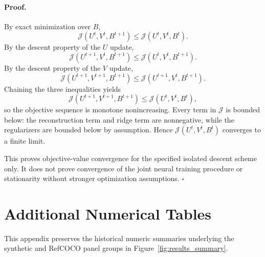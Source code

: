\documentclass[11pt,a4paper]{article}
\begin{document}
\paragraph{Proof.}
By exact minimization over $B$,
\[
\mathcal{J}(U^t,V^t,B^{t+1}) \le \mathcal{J}(U^t,V^t,B^t).
\]
By the descent property of the $U$ update,
\[
\mathcal{J}(U^{t+1},V^t,B^{t+1}) \le \mathcal{J}(U^t,V^t,B^{t+1}).
\]
By the descent property of the $V$ update,
\[
\mathcal{J}(U^{t+1},V^{t+1},B^{t+1}) \le \mathcal{J}(U^{t+1},V^t,B^{t+1}).
\]
Chaining the three inequalities yields
\[
\mathcal{J}(U^{t+1},V^{t+1},B^{t+1}) \le \mathcal{J}(U^t,V^t,B^t),
\]
so the objective sequence is monotone nonincreasing. Every term in $\mathcal{J}$ is bounded below: the reconstruction term and ridge term are nonnegative, while the regularizers are bounded below by assumption. Hence $\mathcal{J}(U^t,V^t,B^t)$ converges to a finite limit.

This proves objective-value convergence for the specified isolated descent scheme only. It does not prove convergence of the joint neural training procedure or stationarity without stronger optimization assumptions. \hfill $\square$

\section{Additional Numerical Tables}
\label{app:numerics}

This appendix preserves the historical numeric summaries underlying the synthetic and RefCOCO panel groups in Figure~\ref{fig:results_summary}.

\begin{table}[htbp]
\caption{Massive synthetic comparison with an unconstrained low-rank factorization. Means and standard deviations are over 20 seeds; paired two-sided $t$-statistics compare CoGround against low-rank on AUROC and supported-mass shift.}
\label{tab:synthetic_massive}
\centering
\footnotesize
\setlength{\tabcolsep}{3pt}
\end{table}
\end{document}
